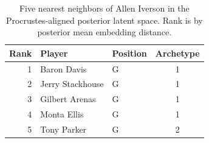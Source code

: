\begin{table}[htbp]
  \centering\small
  \begin{tabular}{rllc}
    \toprule
    Rank & Player & Position & Archetype \\
    \midrule
    1 & Baron Davis & G & 1 \\
    2 & Jerry Stackhouse & G & 1 \\
    3 & Gilbert Arenas & G & 1 \\
    4 & Monta Ellis & G & 1 \\
    5 & Tony Parker & G & 2 \\
    \bottomrule
  \end{tabular}
  \caption{Five nearest neighbors of Allen Iverson in the Procrustes-aligned posterior latent space. Rank is by posterior mean embedding distance.}
  \label{tab:Allen_Iverson_neighbors}
\end{table}

